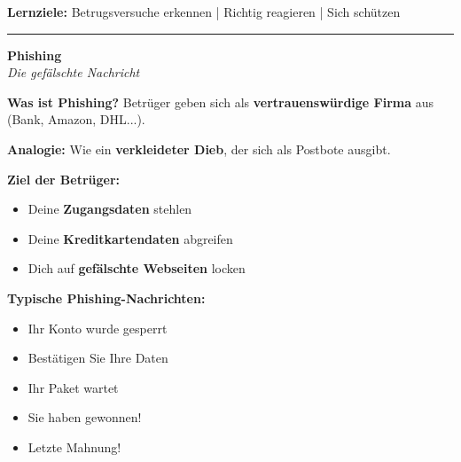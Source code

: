 \documentclass[a4paper,landscape,8pt]{extarticle}
\begin{document}

 \hfill
{\footnotesize\textbf{Lernziele:} Betrugsversuche erkennen | Richtig reagieren | Sich schützen}

\vspace{1mm}
\hrule
\vspace{1mm}

\begin{minipage}[t]{0.32\linewidth}
\begin{center}
\colorbox{phishingred!10}{%
\begin{minipage}{0.95\linewidth}
\vspace{2mm}
\begin{center}
{\Large\bfseries\textcolor{phishingred}{Phishing}}\\[1pt]
{\footnotesize\itshape Die gefälschte Nachricht}
\end{center}
\vspace{2mm}
\end{minipage}%
}
\end{center}

\vspace{1mm}

\textbf{Was ist Phishing?} Betrüger geben sich als \textbf{vertrauenswürdige Firma} aus (Bank, Amazon, DHL...).

\textbf{Analogie:} Wie ein \textbf{verkleideter Dieb}, der sich als Postbote ausgibt.

\textbf{Ziel der Betrüger:}
\begin{itemize}
\item Deine \textbf{Zugangsdaten} stehlen
\item Deine \textbf{Kreditkartendaten} abgreifen
\item Dich auf \textbf{gefälschte Webseiten} locken
\end{itemize}

\textbf{Typische Phishing-Nachrichten:}
\begin{itemize}
\item \glqq Ihr Konto wurde gesperrt\grqq{}
\item \glqq Bestätigen Sie Ihre Daten\grqq{}
\item \glqq Ihr Paket wartet\grqq{}
\item \glqq Sie haben gewonnen!\grqq{}
\item \glqq Letzte Mahnung!\grqq{}
\end{itemize}


\end{minipage}
\end{document}
